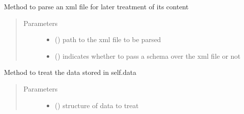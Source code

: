 \begin{fulllineitems}
\begin{fulllineitems}
\label{\detokenize{eboa.engine:eboa.engine.engine.Engine.parse_data_from_xml}}
Method to parse an xml file for later treatment of its content
\begin{quote}\begin{description}
\item[{Parameters}] \leavevmode\begin{itemize}
\item {} 
 () \textendash{} path to the xml file to be parsed

\item {} 
 () \textendash{} indicates whether to pass a schema over the xml file or not

\end{itemize}

\end{description}\end{quote}

\end{fulllineitems}


\begin{fulllineitems}
\label{\detokenize{eboa.engine:eboa.engine.engine.Engine.synchronized}}
\end{fulllineitems}


\begin{fulllineitems}
\label{\detokenize{eboa.engine:eboa.engine.engine.Engine.treat_data}}
Method to treat the data stored in self.data
\begin{quote}\begin{description}
\item[{Parameters}] \leavevmode\begin{itemize}
\item {} 
 () \textendash{} structure of data to treat


\end{itemize}
\end{description}
\end{quote}
\end{fulllineitems}
\end{fulllineitems}
